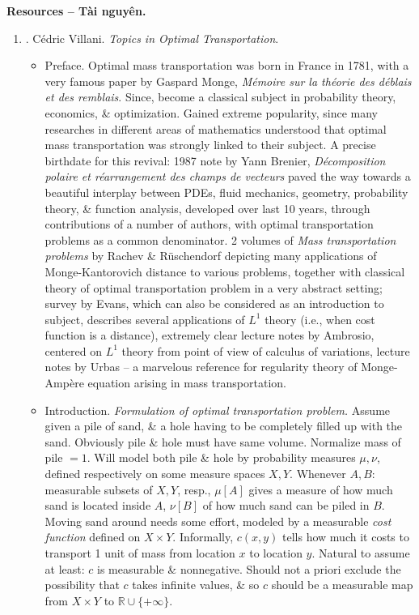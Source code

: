 \documentclass{article}
\begin{document}
\noindent\textbf{\textsf{Resources -- Tài nguyên.}}
\begin{enumerate}
	\item \cite{Villani2003}. {\sc C\'{e}dric Villani}. {\it Topics in Optimal Transportation}.
	
	\begin{itemize}
		\item {\sf Preface.} Optimal mass transportation was born in France in 1781, with a very famous paper by {\sc Gaspard Monge}, {\it M\'emoire sur la th\'eorie des d\'eblais et des remblais}. Since, become a classical subject in probability theory, economics, \& optimization. Gained extreme popularity, since many researches in different areas of mathematics understood that optimal mass transportation was strongly linked to their subject. A precise birthdate for this revival: 1987 note by {\sc Yann Brenier}, {\it D\'ecomposition polaire et r\'earrangement des champs de vecteurs} paved the way towards a beautiful interplay between PDEs, fluid mechanics, geometry, probability theory, \& function analysis, developed over last 10 years, through contributions of a number of authors, with optimal transportation problems as a common denominator. 2 volumes of {\it Mass transportation problems} by {\sc Rachev \& R\"uschendorf} depicting many applications of Monge-Kantorovich distance to various problems, together with classical theory of optimal transportation problem in a very abstract setting; survey by {\sc Evans}, which can also be considered as an introduction to subject, describes several applications of $L^1$ theory (i.e., when cost function is a distance), extremely clear lecture notes by {\sc Ambrosio}, centered on $L^1$ theory from point of view of calculus of variations, lecture notes by {\sc Urbas} -- a marvelous reference for regularity theory of Monge-Amp\`ere equation arising in mass transportation.
		
		\item {\sf Introduction.} {\it Formulation of optimal transportation problem.} Assume given a pile of sand, \& a hole having to be completely filled up with the sand. Obviously pile \& hole must have same volume. Normalize mass of pile $= 1$. Will model both pile \& hole by probability measures $\mu,\nu$, defined respectively on some measure spaces $X,Y$. Whenever $A,B$: measurable subsets of $X,Y$, resp., $\mu[A]$ gives a measure of how much sand is located inside $A$, $\nu[B]$ of how much sand can be piled in $B$. Moving sand around needs some effort, modeled by a measurable {\it cost function} defined on $X\times Y$. Informally, $c(x,y)$ tells how much it costs to transport 1 unit of mass from location $x$ to location $y$. Natural to assume at least: $c$ is measurable \& nonnegative. Should not a priori exclude the possibility that $c$ takes infinite values, \& so $c$ should be a measurable map from $X\times Y$ to $\mathbb{R}\cup\{+\infty\}$.
		

\end{itemize}
\end{enumerate}
\end{document}
